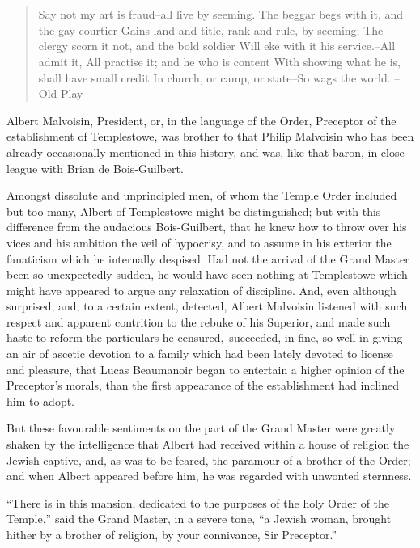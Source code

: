 \chapter{}

\begin{quote}
Say not my art is fraud--all live by seeming.
The beggar begs with it, and the gay courtier
Gains land and title, rank and rule, by seeming;
The clergy scorn it not, and the bold soldier
Will eke with it his service.--All admit it,
All practise it; and he who is content
With showing what he is, shall have small credit
In church, or camp, or state--So wags the world.
--Old Play
\end{quote}

Albert Malvoisin, President, or, in the language of the Order, Preceptor
of the establishment of Templestowe, was brother to that Philip
Malvoisin who has been already occasionally mentioned in this history,
and was, like that baron, in close league with Brian de Bois-Guilbert.

Amongst dissolute and unprincipled men, of whom the Temple Order
included but too many, Albert of Templestowe might be distinguished; but
with this difference from the audacious Bois-Guilbert, that he knew how
to throw over his vices and his ambition the veil of hypocrisy, and to
assume in his exterior the fanaticism which he internally despised. Had
not the arrival of the Grand Master been so unexpectedly sudden, he
would have seen nothing at Templestowe which might have appeared to
argue any relaxation of discipline. And, even although surprised, and,
to a certain extent, detected, Albert Malvoisin listened with such
respect and apparent contrition to the rebuke of his Superior, and made
such haste to reform the particulars he censured,--succeeded, in fine,
so well in giving an air of ascetic devotion to a family which had been
lately devoted to license and pleasure, that Lucas Beaumanoir began to
entertain a higher opinion of the Preceptor's morals, than the first
appearance of the establishment had inclined him to adopt.

But these favourable sentiments on the part of the Grand Master were
greatly shaken by the intelligence that Albert had received within a
house of religion the Jewish captive, and, as was to be feared, the
paramour of a brother of the Order; and when Albert appeared before him,
he was regarded with unwonted sternness.

``There is in this mansion, dedicated to the purposes of the holy Order
of the Temple,'' said the Grand Master, in a severe tone, ``a Jewish
woman, brought hither by a brother of religion, by your connivance, Sir
Preceptor.''


